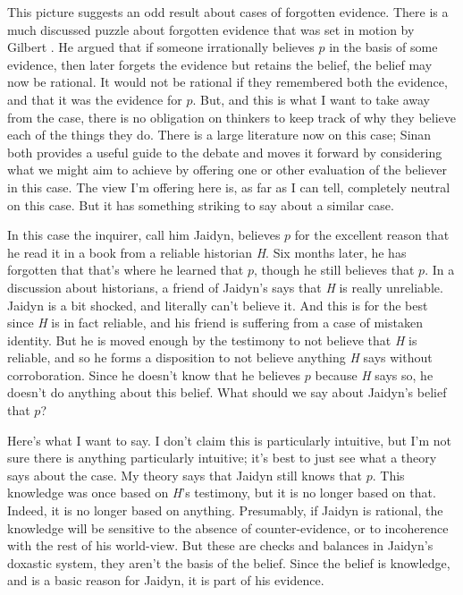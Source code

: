 \documentclass[11pt,]{book}
\begin{document}
This picture suggests an odd result about cases of forgotten evidence. There is a much discussed puzzle about forgotten evidence that was set in motion by Gilbert \citet{Harman1986}. He argued that if someone irrationally believes \(p\) in the basis of some evidence, then later forgets the evidence but retains the belief, the belief may now be rational. It would not be rational if they remembered both the evidence, and that it was the evidence for \(p\). But, and this is what I want to take away from the case, there is no obligation on thinkers to keep track of why they believe each of the things they do. There is a large literature now on this case; Sinan \citet{Dogramaci2015} both provides a useful guide to the debate and moves it forward by considering what we might aim to achieve by offering one or other evaluation of the believer in this case. The view I'm offering here is, as far as I can tell, completely neutral on this case. But it has something striking to say about a similar case.

In this case the inquirer, call him Jaidyn, believes \(p\) for the excellent reason that he read it in a book from a reliable historian \emph{H}. Six months later, he has forgotten that that's where he learned that \(p\), though he still believes that \(p\). In a discussion about historians, a friend of Jaidyn's says that \emph{H} is really unreliable. Jaidyn is a bit shocked, and literally can't believe it. And this is for the best since \emph{H} is in fact reliable, and his friend is suffering from a case of mistaken identity. But he is moved enough by the testimony to not believe that \emph{H} is reliable, and so he forms a disposition to not believe anything \emph{H} says without corroboration. Since he doesn't know that he believes \(p\) because \emph{H} says so, he doesn't do anything about this belief. What should we say about Jaidyn's belief that \(p\)?

Here's what I want to say. I don't claim this is particularly intuitive, but I'm not sure there is anything particularly intuitive; it's best to just see what a theory says about the case. My theory says that Jaidyn still knows that \(p\). This knowledge was once based on \emph{H}'s testimony, but it is no longer based on that. Indeed, it is no longer based on anything. Presumably, if Jaidyn is rational, the knowledge will be sensitive to the absence of counter-evidence, or to incoherence with the rest of his world-view. But these are checks and balances in Jaidyn's doxastic system, they aren't the basis of the belief. Since the belief is knowledge, and is a basic reason for Jaidyn, it is part of his evidence.
\end{document}
